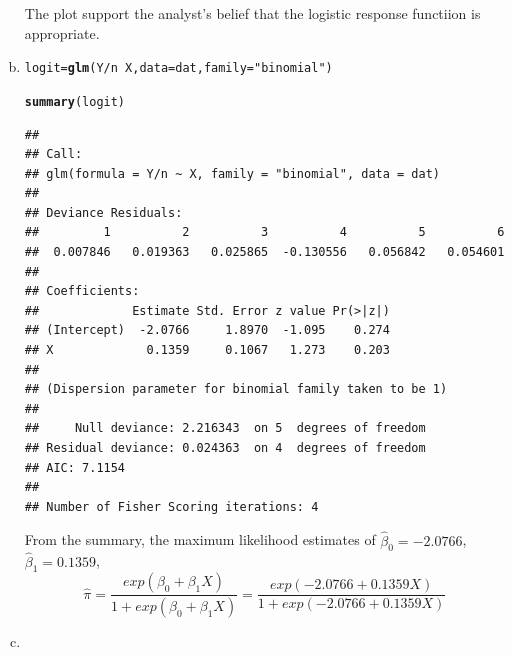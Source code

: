 \documentclass{article}\usepackage[]{graphicx}\usepackage[]{color}
\makeatletter
\newcommand{\hlstr}[1]{\textcolor[rgb]{0.192,0.494,0.8}{#1}}%
\newcommand{\hlopt}[1]{\textcolor[rgb]{0,0,0}{#1}}%
\newcommand{\hlstd}[1]{\textcolor[rgb]{0.345,0.345,0.345}{#1}}%
\newcommand{\hlkwb}[1]{\textcolor[rgb]{0.69,0.353,0.396}{#1}}%
\newcommand{\hlkwc}[1]{\textcolor[rgb]{0.333,0.667,0.333}{#1}}%
\newcommand{\hlkwd}[1]{\textcolor[rgb]{0.737,0.353,0.396}{\textbf{#1}}}%
\newenvironment{kframe}{%
 \def\at@end@of@kframe{}%
 \ifinner\ifhmode%
  \def\at@end@of@kframe{\end{minipage}}%
  \begin{minipage}{\columnwidth}%
 \fi\fi%
 \def\FrameCommand##1{\hskip\@totalleftmargin \hskip-\fboxsep
 \colorbox{shadecolor}{##1}\hskip-\fboxsep
     \hskip-\linewidth \hskip-\@totalleftmargin \hskip\columnwidth}%
 \MakeFramed {\advance\hsize-\width
   \@totalleftmargin\z@ \linewidth\hsize
   \@setminipage}}%
 {\par\unskip\endMakeFramed%
 \at@end@of@kframe}
\newenvironment{knitrout}{}{} %
\makeatother
\begin{document}
\begin{enumerate}[(a)]
\begin{knitrout}
\end{knitrout}

\qquad The plot support the analyst's belief that the logistic response functiion is appropriate.

\item

\begin{knitrout}
\color{fgcolor}\begin{kframe}
\begin{alltt}
  \hlstd{logit} \hlkwb{=} \hlkwd{glm}\hlstd{(Y}\hlopt{/}\hlstd{n} \hlopt{~} \hlstd{X,} \hlkwc{data} \hlstd{= dat,} \hlkwc{family} \hlstd{=} \hlstr{"binomial"}\hlstd{)}
\end{alltt}


{\ttfamily\noindent\color{warningcolor}{\#\# Warning: non-integer \#successes in a binomial glm!}}\begin{alltt}
  \hlkwd{summary}\hlstd{(logit)}
\end{alltt}
\begin{verbatim}
## 
## Call:
## glm(formula = Y/n ~ X, family = "binomial", data = dat)
## 
## Deviance Residuals: 
##         1          2          3          4          5          6  
##  0.007846   0.019363   0.025865  -0.130556   0.056842   0.054601  
## 
## Coefficients:
##             Estimate Std. Error z value Pr(>|z|)
## (Intercept)  -2.0766     1.8970  -1.095    0.274
## X             0.1359     0.1067   1.273    0.203
## 
## (Dispersion parameter for binomial family taken to be 1)
## 
##     Null deviance: 2.216343  on 5  degrees of freedom
## Residual deviance: 0.024363  on 4  degrees of freedom
## AIC: 7.1154
## 
## Number of Fisher Scoring iterations: 4
\end{verbatim}
\end{kframe}
\end{knitrout}

\qquad From the summary, the maximum likelihood estimates of $\hat{\beta}_0 = -2.0766$, $\hat{\beta}_1 = 0.1359$, $$\hat{\pi} = \frac{exp(\beta_0+\beta_1 X)}{1+exp(\beta_0+\beta_1 X)}=\frac{exp(-2.0766+0.1359 X)}{1+exp(-2.0766+0.1359 X)}$$

\item


\end{enumerate}
\end{document}
